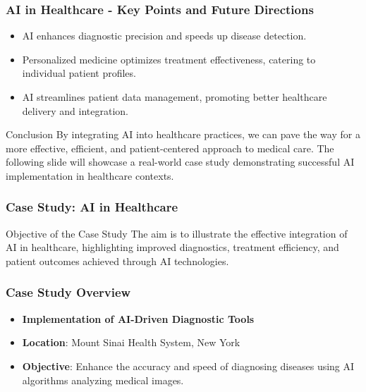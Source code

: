 \documentclass{beamer}
\begin{document}
\begin{frame}[fragile]
    \frametitle{AI in Healthcare - Key Points and Future Directions}
    \begin{itemize}
        \item AI enhances diagnostic precision and speeds up disease detection.
        \item Personalized medicine optimizes treatment effectiveness, catering to individual patient profiles.
        \item AI streamlines patient data management, promoting better healthcare delivery and integration.
    \end{itemize}
    
    \begin{block}{Conclusion}
        By integrating AI into healthcare practices, we can pave the way for a more effective, efficient, and patient-centered approach to medical care. The following slide will showcase a real-world case study demonstrating successful AI implementation in healthcare contexts.
    \end{block}
\end{frame}

\begin{frame}[fragile]
    \frametitle{Case Study: AI in Healthcare}
    \begin{block}{Objective of the Case Study}
        The aim is to illustrate the effective integration of AI in healthcare, highlighting improved diagnostics, treatment efficiency, and patient outcomes achieved through AI technologies.
    \end{block}
\end{frame}

\begin{frame}[fragile]
    \frametitle{Case Study Overview}
    \begin{itemize}
        \item \textbf{Implementation of AI-Driven Diagnostic Tools}
        \item \textbf{Location}: Mount Sinai Health System, New York
        \item \textbf{Objective}: Enhance the accuracy and speed of diagnosing diseases using AI algorithms analyzing medical images.
    \end{itemize}
\end{frame}
\end{document}
